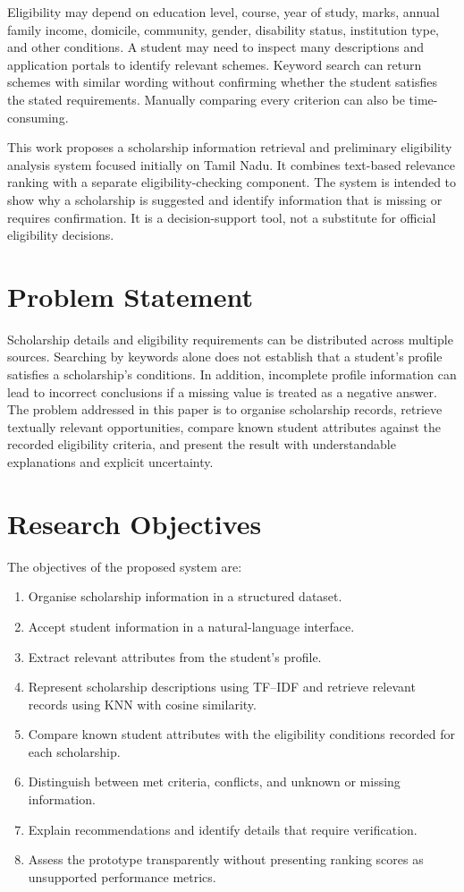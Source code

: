 \documentclass[conference]{IEEEtran}
\begin{document}
Eligibility may depend on education level, course, year of study, marks, annual family income, domicile, community, gender, disability status, institution type, and other conditions. A student may need to inspect many descriptions and application portals to identify relevant schemes. Keyword search can return schemes with similar wording without confirming whether the student satisfies the stated requirements. Manually comparing every criterion can also be time-consuming.

This work proposes a scholarship information retrieval and preliminary eligibility analysis system focused initially on Tamil Nadu. It combines text-based relevance ranking with a separate eligibility-checking component. The system is intended to show why a scholarship is suggested and identify information that is missing or requires confirmation. It is a decision-support tool, not a substitute for official eligibility decisions.

\section{Problem Statement}
Scholarship details and eligibility requirements can be distributed across multiple sources. Searching by keywords alone does not establish that a student's profile satisfies a scholarship's conditions. In addition, incomplete profile information can lead to incorrect conclusions if a missing value is treated as a negative answer. The problem addressed in this paper is to organise scholarship records, retrieve textually relevant opportunities, compare known student attributes against the recorded eligibility criteria, and present the result with understandable explanations and explicit uncertainty.

\section{Research Objectives}
The objectives of the proposed system are:
\begin{enumerate}
  \item Organise scholarship information in a structured dataset.
  \item Accept student information in a natural-language interface.
  \item Extract relevant attributes from the student's profile.
  \item Represent scholarship descriptions using TF--IDF and retrieve relevant records using KNN with cosine similarity.
  \item Compare known student attributes with the eligibility conditions recorded for each scholarship.
  \item Distinguish between met criteria, conflicts, and unknown or missing information.
  \item Explain recommendations and identify details that require verification.
  \item Assess the prototype transparently without presenting ranking scores as unsupported performance metrics.
\end{enumerate}
\end{document}
